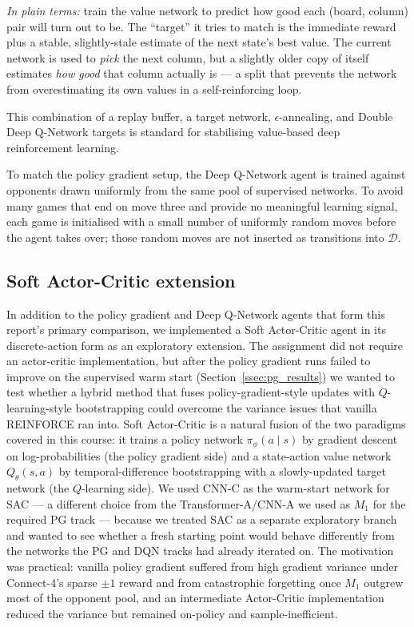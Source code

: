 \documentclass[11pt]{article}
\begin{document}
\textit{In plain terms:} train the value network to predict how good
each (board, column) pair will turn out to be. The ``target'' it
tries to match is the immediate reward plus a stable, slightly-stale
estimate of the next state's best value. The current network is used
to \emph{pick} the next column, but a slightly older copy of itself
estimates \emph{how good} that column actually is --- a split that
prevents the network from overestimating its own values in a
self-reinforcing loop.

This combination of a replay buffer, a target network,
$\epsilon$-annealing, and Double Deep Q-Network targets is standard for
stabilising value-based deep reinforcement learning.

To match the policy gradient setup, the Deep Q-Network agent is trained
against opponents drawn uniformly from the same pool of supervised networks.
To avoid many games that end on move three and provide no meaningful
learning signal, each game is initialised with a small number of uniformly
random moves before the agent takes over; those random moves are not
inserted as transitions into $\mathcal{D}$.

\subsection{Soft Actor-Critic extension}
\label{ssec:sac}

In addition to the policy gradient and Deep Q-Network agents that form
this report's primary comparison, we implemented a Soft Actor-Critic
agent in its discrete-action form as an exploratory extension. The
assignment did not require an actor-critic implementation, but after
the policy gradient runs failed to improve on the supervised warm
start (Section~\ref{ssec:pg_results}) we wanted to test whether a
hybrid method that fuses policy-gradient-style updates with
$Q$-learning-style bootstrapping could overcome the variance issues
that vanilla REINFORCE ran into. Soft Actor-Critic is a natural
fusion of the two paradigms covered in this course: it trains a
policy network $\pi_\phi(a \mid s)$ by gradient descent on
log-probabilities (the policy gradient side) and a state-action value
network $Q_\theta(s, a)$ by temporal-difference bootstrapping with a
slowly-updated target network (the $Q$-learning side). We used CNN-C
as the warm-start network for SAC --- a different choice from the
Transformer-A/CNN-A we used as $M_1$ for the required PG track ---
because we treated SAC as a separate exploratory branch and wanted to
see whether a fresh starting point would behave differently from the
networks the PG and DQN tracks had already iterated on. The
motivation was practical: vanilla policy gradient suffered
from high gradient variance under Connect-4's sparse $\pm 1$ reward and
from catastrophic forgetting once $M_1$ outgrew most of the opponent
pool, and an intermediate Actor-Critic implementation reduced the
variance but remained on-policy and sample-inefficient.
\end{document}

